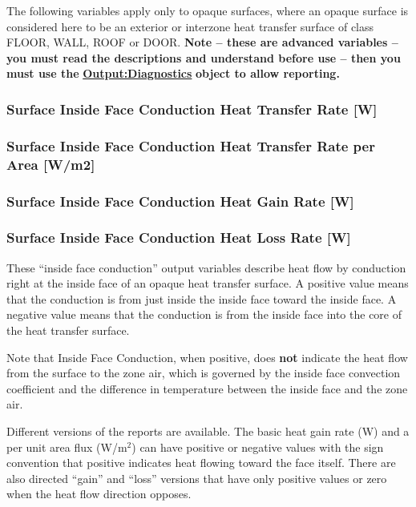 The following variables apply only to opaque surfaces, where an opaque surface is considered here to be an exterior or interzone heat transfer surface of class FLOOR, WALL, ROOF or DOOR. \textbf{Note -- these are advanced variables -- you must read the descriptions and understand before use -- then you must use the} \textbf{\hyperref[outputdiagnostics]{Output:Diagnostics}} \textbf{object to allow reporting.}

\subsubsection{Surface Inside Face Conduction Heat Transfer Rate {[}W{]}}\label{surface-inside-face-conduction-heat-transfer-rate-w}

\subsubsection{Surface Inside Face Conduction Heat Transfer Rate per Area {[}W/m2{]}}\label{surface-inside-face-conduction-heat-transfer-rate-per-area-wm2}

\subsubsection{Surface Inside Face Conduction Heat Gain Rate {[}W{]}}\label{surface-inside-face-conduction-heat-gain-rate-w}

\subsubsection{Surface Inside Face Conduction Heat Loss Rate {[}W{]}}\label{surface-inside-face-conduction-heat-loss-rate-w}

These ``inside face conduction'' output variables describe heat flow by conduction right at the inside face of an opaque heat transfer surface. A positive value means that the conduction is from just inside the inside face toward the inside face. A negative value means that the conduction is from the inside face into the core of the heat transfer surface.

Note that Inside Face Conduction, when positive, does \textbf{not} indicate the heat flow from the surface to the zone air, which is governed by the inside face convection coefficient and the difference in temperature between the inside face and the zone air.

Different versions of the reports are available. The basic heat gain rate (W) and a per unit area flux (W/m\(^{2}\)) can have positive or negative values with the sign convention that positive indicates heat flowing toward the face itself. There are also directed ``gain'' and ``loss'' versions that have only positive values or zero when the heat flow direction opposes.


